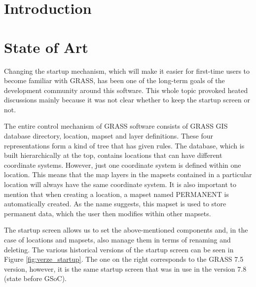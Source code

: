 \documentclass[a4paper,10pt,twoside]{article}
\begin{document}
\section*{Introduction}
\large
\setcounter{page}{13}  %


\newpage
\vspace*{-1cm}
\section{State of Art}
\label{State of Art}
\noindent
\large

\noindent Changing the startup mechanism, which will make it easier for first-time users to become familiar with GRASS, has been one of the long-term goals of the development community around this software. This whole topic provoked heated discussions mainly because it was not clear whether to keep the startup screen or not.

The entire control mechanism of GRASS software consists of GRASS GIS database directory, location, mapset and layer definitions. These four representations form a kind of tree that has given rules. The database, which is built hierarchically at the top, contains locations that can have different coordinate systems. However, just one coordinate system is defined within one location. This means that the map layers in the mapsets contained in a particular location will always have the same coordinate system. It is also important to mention that when creating a location, a mapset named PERMANENT is automatically created. As the name suggests, this mapset is used to store permanent data, which the user then modifies within other mapsets.

The startup screen allows us to set the above-mentioned components and, in the case of locations and mapsets, also manage them in terms of renaming and deleting. The various historical versions of the startup screen can be seen in Figure \ref{fig:verze_startup}. The one on the right corresponds to the GRASS 7.5 version, however, it is the same startup screen that was in use in the version 7.8 (state before GSoC).  
\end{document}
